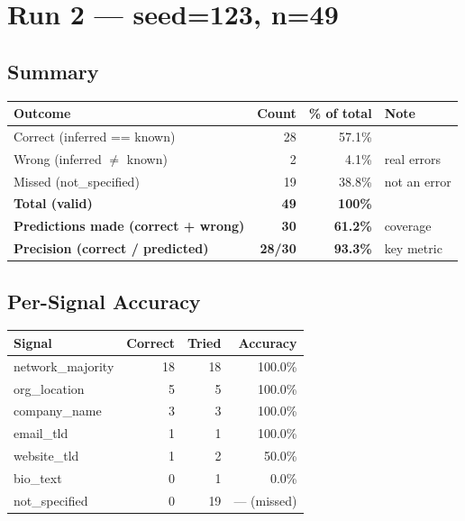 \documentclass[11pt,a4paper]{article}
\begin{document}
\section{Run 2 — seed=123, n=49}

\subsection*{Summary}

\begin{tabular}{lrrl}
\toprule
\textbf{Outcome} & \textbf{Count} & \textbf{\% of total} & \textbf{Note} \\
\midrule
Correct (inferred == known) & 28 & 57.1\% & \\
Wrong   (inferred $\neq$ known) &  2 &  4.1\% & real errors \\
Missed  (not\_specified)    & 19 & 38.8\% & not an error \\
\midrule
\textbf{Total (valid)} & \textbf{49} & \textbf{100\%} & \\
\midrule
\textbf{Predictions made (correct + wrong)} & \textbf{30} & \textbf{61.2\%} & coverage \\
\textbf{Precision (correct / predicted)}    & \textbf{28/30} & \textbf{93.3\%} & key metric \\
\bottomrule
\end{tabular}

\vspace{8pt}

\subsection*{Per-Signal Accuracy}

\begin{tabular}{lrrr}
\toprule
\textbf{Signal} & \textbf{Correct} & \textbf{Tried} & \textbf{Accuracy} \\
\midrule
network\_majority  & 18 & 18 & 100.0\% \\
org\_location      &  5 &  5 & 100.0\% \\
company\_name      &  3 &  3 & 100.0\% \\
email\_tld         &  1 &  1 & 100.0\% \\
website\_tld       &  1 &  2 &  50.0\% \\
bio\_text          &  0 &  1 &   0.0\% \\
\midrule
not\_specified     &  0 & 19 & — (missed) \\
\bottomrule
\end{tabular}
\end{document}
